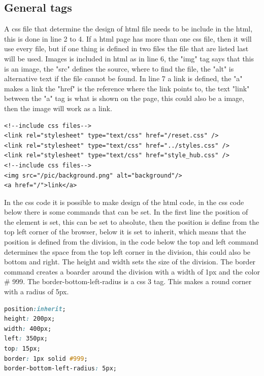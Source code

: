 \subsection{General tags}
A css file that determine the design of html file needs to be include in the html, this is done in line 2 to 4. If a html page has more than one css file, then it will use every file, but if one thing is defined in two files the file that are listed last will be used. Images is included in html as in line 6, the "img" tag says that this is an image, the "src" defines the source, where to find the file, the "alt" is alternative text if the file cannot be found. In line 7 a link is defined, the "a" makes a link the "href" is the reference where the link points to, the text "link" between the "a" tag is what is shown on the page, this could also be a image, then the image will work as a link.
\begin{lstlisting}
<!--include css files-->
<link rel="stylesheet" type="text/css" href="/reset.css" />
<link rel="stylesheet" type="text/css" href="../styles.css" />
<link rel="stylesheet" type="text/css" href="style_hub.css" />
<!--include css files-->
<img src="/pic/background.png" alt="background"/>
<a href="/">link</a>
\end{lstlisting}
In the css code it is possible to make design of the html code, in the css code below there is some commands that can be set. In the first line the position of the element is set, this can be set to absolute, then the position is define from the top left corner of the browser, below it is set to inherit, which means that the position is defined from the division, in the code below the top and left command determines the space from the top left corner in the division, this could also be bottom and right. The height and width sets the size of the division. The border command creates a boarder around the division with a width of 1px and the color \# 999. The border-bottom-left-radius is a css 3 tag. This makes a round corner with a radius of 5px.
\begin{lstlisting}[language=CSS]
position:inherit;
height: 200px;
width: 400px;
left: 350px;
top: 15px;
border: 1px solid #999;
border-bottom-left-radius: 5px;
\end{lstlisting}